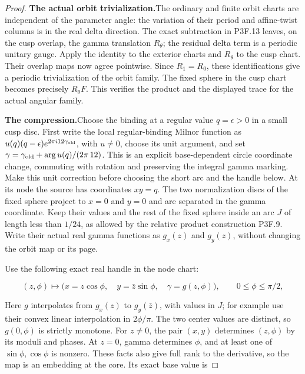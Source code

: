 \begin{proof}
\par\medskip\noindent\textbf{The actual orbit trivialization.}\enspace The ordinary and finite
orbit charts are independent of the parameter angle: the variation
of their period and affine-twist columns is in the real delta
direction.  The exact subtraction in P3F.13 leaves, on the cusp
overlap, the gamma translation \(R_\theta\); the residual delta term
is a periodic unitary gauge.  Apply the identity to the exterior
charts and \(R_\theta\) to the cusp chart.  Their overlap maps now
agree pointwise.  Since \(R_1=R_0\), these identifications give a
periodic trivialization of the orbit family.  The fixed sphere in
the cusp chart becomes precisely \(R_\theta F\).  This verifies the
product and the displayed trace for the actual angular family.

\par\medskip\noindent\textbf{The compression.}\enspace Choose the binding at a regular value
\(q=\epsilon>0\) in a small cusp disc.  First write the local
regular-binding Milnor function as
\(u(q)(q-\epsilon)e^{2\pi i12\gamma_{\rm old}}\), with \(u\ne0\),
choose its unit argument, and set
\(\gamma=\gamma_{\rm old}+\arg u(q)/(2\pi\,12)\).
This is an explicit base-dependent circle coordinate change,
commuting with rotation and preserving the integral gamma marking.
Make this unit correction before choosing the short arc and the
handle below.  At its node the source has
coordinates \(xy=q\).  The two normalization discs of the fixed
sphere project to \(x=0\) and \(y=0\) and are separated in the gamma
coordinate.  Keep their values and the rest of the fixed sphere
inside an arc \(J\) of length less than \(1/24\), as allowed by the
relative product construction P3F.9.  Write their actual real gamma
functions as \(g_x(z)\) and \(g_y(z)\), without changing the orbit
map or its page.

Use the following exact real handle in the node chart:

\[
 (z,\phi)\longmapsto
 \bigl(x=z\cos\phi,\quad y=\bar z\sin\phi,\quad
       \gamma=g(z,\phi)\bigr),
 \qquad 0\leq\phi\leq\pi/2,
\]

Here \(g\) interpolates from \(g_x(z)\) to \(g_y(\bar z)\), with
values in \(J\); for example use their convex linear interpolation
in \(2\phi/\pi\).  The two center values are distinct, so
\(g(0,\phi)\) is strictly monotone.  For \(z\ne0\), the pair
\((x,y)\) determines \((z,\phi)\) by its moduli and phases.  At
\(z=0\), gamma determines \(\phi\), and at least one of
\(\sin\phi,\cos\phi\) is nonzero.  These facts also give full
rank to the derivative, so the map is an embedding at the core.
Its exact base value is


\end{proof}
